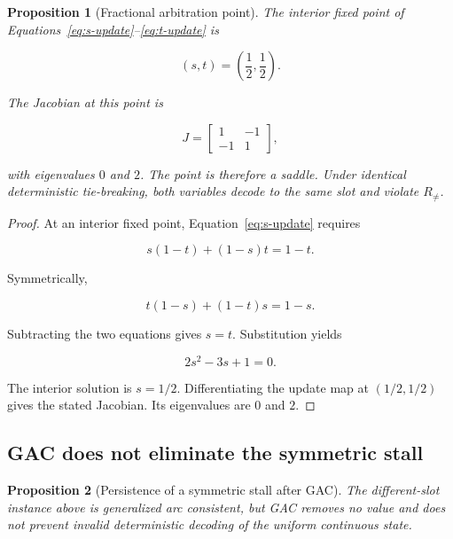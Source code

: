 \documentclass[pdflatex,sn-mathphys-num,iicol,oneside]{sn-jnl}
\newtheorem{proposition}{Proposition}
\begin{document}
\begin{proposition}[Fractional arbitration point]
The interior fixed point of
Equations~\eqref{eq:s-update}--\eqref{eq:t-update} is

\begin{equation}
(s,t)
=
\left(
\frac{1}{2},
\frac{1}{2}
\right).
\end{equation}

The Jacobian at this point is

\begin{equation}
J
=
\begin{bmatrix}
1 & -1\\
-1 & 1
\end{bmatrix},
\end{equation}

with eigenvalues $0$ and $2$. The point is therefore a saddle.
Under identical deterministic tie-breaking, both variables decode to
the same slot and violate $R_{\neq}$.
\end{proposition}

\begin{proof}
At an interior fixed point,
Equation~\eqref{eq:s-update} requires

\begin{equation}
s(1-t)+(1-s)t=1-t.
\end{equation}

Symmetrically,

\begin{equation}
t(1-s)+(1-t)s=1-s.
\end{equation}

Subtracting the two equations gives $s=t$. Substitution yields

\begin{equation}
2s^2-3s+1=0.
\end{equation}

The interior solution is $s=1/2$. Differentiating the update map at
$(1/2,1/2)$ gives the stated Jacobian. Its eigenvalues are $0$ and
$2$.
\end{proof}

\subsection{GAC does not eliminate the symmetric stall}

\begin{proposition}[Persistence of a symmetric stall after GAC]
The different-slot instance above is generalized arc consistent, but
GAC removes no value and does not prevent invalid deterministic
decoding of the uniform continuous state.
\end{proposition}
\end{document}
